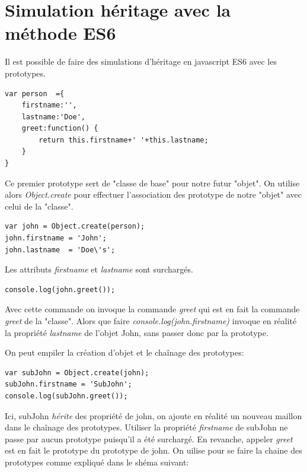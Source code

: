 \documentclass[12pt,oneside]{scrbook}
\begin{document}
\section{Simulation héritage avec la méthode ES6}
Il est possible de faire des simulations d'héritage en javascript ES6 avec les prototypes.

\begin{verbatim}
var person  ={
    firstname:'',
    lastname:'Doe',
    greet:function() {
        return this.firstname+' '+this.lastname;
    }
}
\end{verbatim}
Ce premier prototype sert de "classe de base" pour notre futur "objet". On utilise alors \textit{Object.create} pour effectuer l'association des prototype de notre "objet" avec celui de la "classe".
\begin{verbatim}
var john = Object.create(person);
john.firstname = 'John';
john.lastname  = 'Doe\'s';
\end{verbatim}
Les attributs \textit{firstname} et \textit{lastname} sont surchargés.
\begin{verbatim}
console.log(john.greet());
\end{verbatim}
Avec cette commande on invoque la commande \textit{greet} qui est en fait la commande \textit{greet} de la "classe". Alors que faire \textit{console.log(john.firstname)} invoque en réalité la propriété \textit{lastname} de l'objet John, sans passer donc par la prototype.

On peut empiler la création d'objet et le chaînage des prototypes:
\begin{verbatim}
var subJohn = Object.create(john);
subJohn.firstname = 'SubJohn';
console.log(subJohn.greet());
\end{verbatim}
Ici, subJohn \textit{hérite} des propriété de john, on ajoute en réalité un nouveau maillon dans le chaînage des prototypes. Utiliser la propriété \textit{firstname} de subJohn ne passe par aucun prototype puisqu'il a été surchargé. En revanche, appeler \textit{greet} est en fait le prototype du prototype de john.
On uilise pour se faire la chaine des prototypes comme expliqué dans le shéma suivant:
\end{document}
